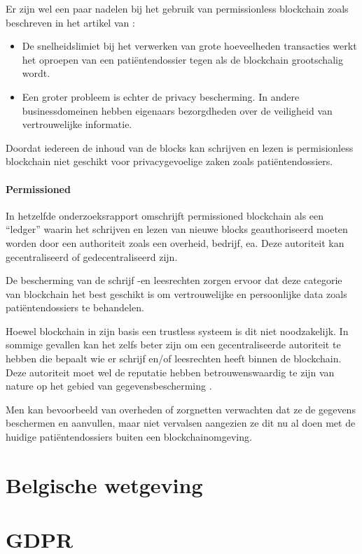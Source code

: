 Er zijn wel een paar nadelen bij het gebruik van permissionless blockchain zoals beschreven in het artikel van \textcite{Liu}:
\begin{itemize}
    \item De snelheidslimiet bij het verwerken van grote hoeveelheden transacties werkt het oproepen van een patiëntendossier tegen als de blockchain grootschalig wordt.
    \item Een groter probleem is echter de privacy bescherming. In andere businessdomeinen hebben eigenaars bezorgdheden over de veiligheid van vertrouwelijke informatie.
\end{itemize}


Doordat iedereen de inhoud van de blocks kan schrijven en lezen is permisionless blockchain niet geschikt voor privacygevoelige zaken zoals patiëntendossiers.


\paragraph{Permissioned}

In hetzelfde onderzoeksrapport omschrijft \textcite{Yaga2018} permissioned blockchain als een ``ledger'' waarin het schrijven en lezen van nieuwe blocks geauthoriseerd moeten worden door een authoriteit zoals een overheid, bedrijf, ea. Deze autoriteit kan gecentraliseerd of gedecentraliseerd zijn.

De bescherming van de schrijf -en leesrechten zorgen ervoor dat deze categorie van blockchain het best geschikt is om vertrouwelijke en persoonlijke data zoals patiëntendossiers te behandelen.

Hoewel blockchain in zijn basis een trustless systeem is dit niet noodzakelijk. In sommige gevallen kan het zelfs beter zijn om een gecentraliseerde autoriteit te hebben die bepaalt wie er schrijf en/of leesrechten heeft binnen de blockchain. Deze autoriteit moet wel de reputatie hebben betrouwenswaardig te zijn van nature op het gebied van gegevensbescherming \autocite{Bacon2018}. 

Men kan bevoorbeeld van overheden of zorgnetten verwachten dat ze de gegevens beschermen en aanvullen, maar niet vervalsen aangezien ze dit nu al doen met de huidige patiëntendossiers buiten een blockchainomgeving.


\section{Belgische wetgeving}


\section{GDPR}